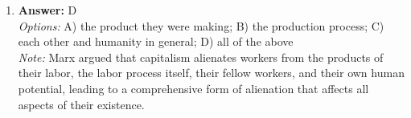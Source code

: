 \documentclass[12pt]{article}
\begin{document}
\begin{enumerate}[label=\arabic*.]
\\ \textit{Options:} A) a shared sense of identity and belonging together; B) common activities involving all-round relationships; C) a fixed geographical location; D) collective action based on common interests
\\ \textit{Note:} Fulcher \& Scott identify various criteria for community, such as social ties and shared values, but do not consider a fixed geographical location as a necessary criterion, emphasizing that community can exist in non-geographical contexts.
\item \textbf{Answer:} D
\\ \textit{Options:} A) the product they were making; B) the production process; C) each other and humanity in general; D) all of the above
\\ \textit{Note:} Marx argued that capitalism alienates workers from the products of their labor, the labor process itself, their fellow workers, and their own human potential, leading to a comprehensive form of alienation that affects all aspects of their existence.
\end{enumerate}
\end{document}
